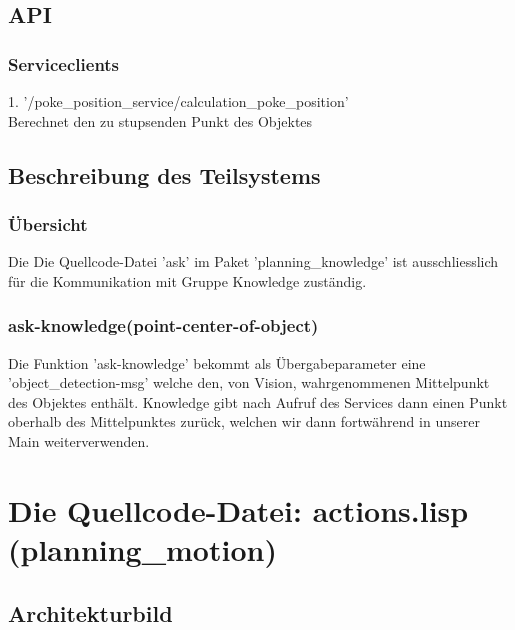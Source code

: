 \documentclass{suturo}
\begin{document}
\subsection{API}
\subsubsection{Serviceclients}
1. '/poke\_position\_service/calculation\_poke\_position' \\
Berechnet den zu stupsenden Punkt des Objektes
\subsection{Beschreibung des Teilsystems}
\subsubsection{\"Ubersicht}
Die Die Quellcode-Datei 'ask' im Paket 'planning\_knowledge' ist ausschliesslich für die Kommunikation mit Gruppe Knowledge zust\"andig.
\subsubsection{ask-knowledge(point-center-of-object)}
Die Funktion 'ask-knowledge' bekommt als \"Ubergabeparameter eine 'object\_detection-msg' welche den, von Vision, wahrgenommenen Mittelpunkt des Objektes enthält. Knowledge gibt nach Aufruf des Services dann einen Punkt oberhalb des Mittelpunktes zur\"uck, welchen wir dann fortw\"ahrend in unserer Main weiterverwenden.

\section{Die Quellcode-Datei: actions.lisp (planning\_motion)}
\subsection{Architekturbild}


\begin{figure}[!htb]
\end{figure}
\end{document}
